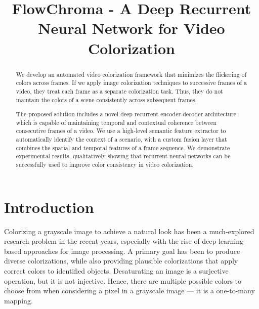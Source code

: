 \documentclass[10pt,twocolumn,letterpaper]{article}
\begin{document}
\title{FlowChroma - A Deep Recurrent Neural Network for Video Colorization}


\maketitle
\ifwacvfinal\thispagestyle{empty}\fi
\begin{abstract}
   We develop an automated video colorization framework that minimizes the flickering of colors across frames. If we apply image colorization techniques to successive frames of a video, they treat each frame as a separate colorization task. Thus, they do not maintain the colors of a scene consistently across subsequent frames.

The proposed solution includes a novel deep recurrent encoder-decoder architecture which is capable of maintaining temporal and contextual coherence between consecutive frames of a video. We use a high-level semantic feature extractor to automatically identify the context of a scenario, with a custom fusion layer that combines the spatial and temporal features of a frame sequence. We demonstrate experimental results, qualitatively showing that recurrent neural networks can be successfully used to improve color consistency in video colorization.
\end{abstract}

\section{Introduction}
Colorizing a grayscale image to achieve a natural look has been a much-explored research problem in the recent years, especially with the rise of deep learning-based approaches for image processing. A primary goal has been to produce diverse colorizations, while also providing plausible colorizations that apply correct colors to identified objects. Desaturating an image is a surjective operation, but it is not injective. Hence, there are multiple possible colors to choose from when considering a pixel in a grayscale image --- it is a one-to-many mapping.
\end{document}
